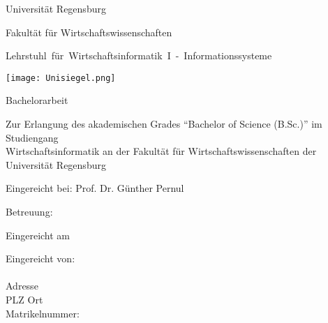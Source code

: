 %
%
%

\thispagestyle{empty}
\begin{titlepage}

\begin{adjustwidth}{-2cm}{}


\renewcommand{\thepage}{}

\begin{center}

\large{Universität Regensburg\\}

\large{Fakultät für Wirtschaftswissenschaften\\}

\large{\mbox{Lehrstuhl für Wirtschaftsinformatik I - Informationssysteme}}

\vspace*{5mm}

\Large{\textbf{\titelthema}}

\vspace*{5mm}
\texttt{[image: Unisiegel.png]}
\vspace*{4mm}

\Large{Bachelorarbeit}

\vspace*{5mm}


\end{center}
\begin{center}
Zur Erlangung des akademischen Grades "`Bachelor of Science (B.Sc.)"' im Studiengang\\
Wirtschaftsinformatik an der Fakultät für Wirtschaftswissenschaften der\\
Universität Regensburg

\vspace*{5mm}

\Large{Eingereicht bei: Prof. Dr. Günther Pernul\\}

\Large{Betreuung: \betreuer\\}

\end{center}

\vfill

\begin{center}
\large{Eingereicht am \abgabedatum\\}
\end{center}
\vspace*{0.6cm}
\begin{flushleft}
Eingereicht von:\\
\vspace*{7pt}
\authorname\\
Adresse\\
PLZ Ort\\
Matrikelnummer: \matrikelnr\\




\end{flushleft}

\end{adjustwidth}

\end{titlepage}

\newpage


